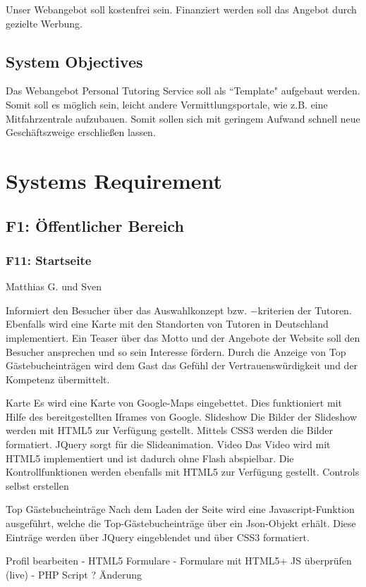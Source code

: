 \documentclass[10pt,a4paper]{scrartcl}
\begin{document}
Unser Webangebot soll kostenfrei sein. Finanziert werden soll das Angebot durch 
gezielte Werbung.

\subsection{System Objectives}
Das Webangebot Personal Tutoring Service soll als ``Template" aufgebaut werden. 
Somit soll es möglich sein, leicht andere Vermittlungsportale, wie z.B. eine 
Mitfahrzentrale aufzubauen. Somit sollen sich mit geringem Aufwand schnell neue 
Geschäftszweige erschließen lassen.

\section{Systems Requirement}

\subsection{F1: Öffentlicher Bereich}
\subsubsection*{F11: Startseite}
Matthias G. und Sven

Informiert den Besucher über das Auswahlkonzept bzw. $-$kriterien der Tutoren. Ebenfalls wird eine Karte mit den Standorten von Tutoren in Deutschland implementiert. Ein Teaser über das Motto und der Angebote der Website soll den Besucher ansprechen und so sein Interesse fördern. Durch die Anzeige von Top Gästebucheinträgen wird dem Gast das Gefühl der Vertrauenswürdigkeit und der Kompetenz übermittelt. 

Karte
Es wird eine Karte von Google-Maps eingebettet. Dies funktioniert mit Hilfe des bereitgestellten Iframes von Google.
Slideshow
Die Bilder der Slideshow werden mit HTML5 zur Verfügung gestellt. Mittels CSS3 werden die Bilder formatiert. JQuery sorgt für die Slideanimation. 
Video
Das Video wird mit HTML5 implementiert und ist dadurch ohne Flash abspielbar. Die Kontrollfunktionen werden ebenfalls mit HTML5 zur Verfügung gestellt.
Controls selbst erstellen

Top Gästebucheinträge
Nach dem Laden der Seite wird eine Javascript-Funktion ausgeführt, welche die Top-Gästebucheinträge über ein Json-Objekt erhält. Diese Einträge werden über JQuery eingeblendet und über CSS3 formatiert.

Profil bearbeiten
- HTML5 Formulare
- Formulare mit HTML5+ JS überprüfen (live)
- PHP Script ? Änderung
\end{document}

